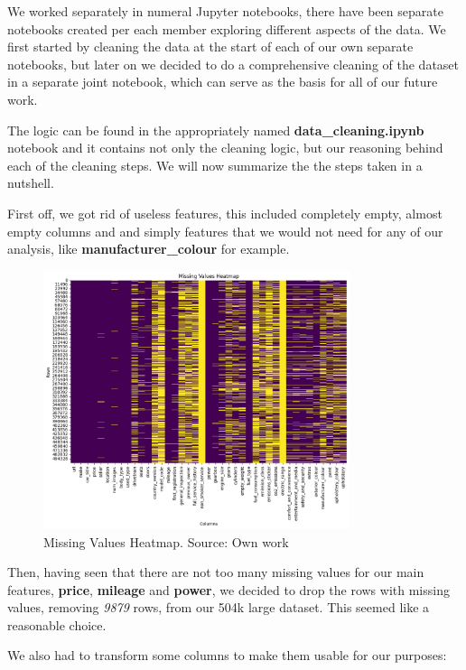 \documentclass[12pt]{article}
\begin{document}
We worked separately in numeral Jupyter notebooks, there have been separate notebooks created per each member exploring different aspects of the data. We first started by cleaning the data at the start of each of our own separate notebooks, but later on we decided to do a comprehensive cleaning of the dataset in a separate joint notebook, which can serve as the basis for all of our future work.

The logic can be found in the appropriately named \textbf{data\_cleaning.ipynb} notebook and it contains not only the cleaning logic, but our reasoning behind each of the cleaning steps. We will now summarize the the steps taken in a nutshell.

First off, we got rid of useless features, this included completely empty, almost empty columns and and simply features that we would not need for any of our analysis, like \textbf{manufacturer\_colour} for example.

\begin{figure}[ht]
  \centering
  \includegraphics[width=0.8\textwidth]{./images/missing_values_heatmap.png}
  \caption{Missing Values Heatmap. Source: Own work}
  \label{fig:missing_values_heatmap}
\end{figure}

Then, having seen that there are not too many missing values for our main features, \textbf{price}, \textbf{mileage} and \textbf{power}, we decided to drop the rows with missing values, removing \textit{9879} rows, from our 504k large dataset. This seemed like a reasonable choice.

We also had to transform some columns to make them usable for our purposes:
\end{document}
